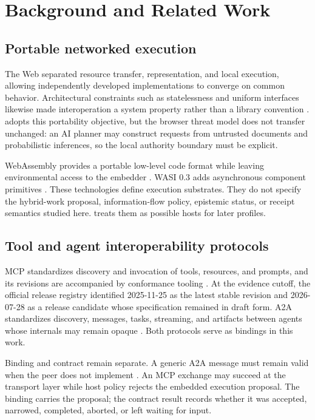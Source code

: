 \section{Background and Related Work}
\label{sec:background}

\subsection{Portable networked execution}
The Web separated resource transfer, representation, and local execution, allowing independently developed implementations to converge on common behavior. Architectural constraints such as statelessness and uniform interfaces likewise made interoperation a system property rather than a library convention \cite{Fielding2000}. \AUEC adopts this portability objective, but the browser threat model does not transfer unchanged: an AI planner may construct requests from untrusted documents and probabilistic inferences, so the local authority boundary must be explicit.

WebAssembly provides a portable low-level code format while leaving environmental access to the embedder \cite{Haas2017,W3CWasm2026}. WASI 0.3 adds asynchronous component primitives \cite{WASI03_2026}. These technologies define execution substrates. They do not specify the hybrid-work proposal, information-flow policy, epistemic status, or receipt semantics studied here. \AUEC treats them as possible hosts for later profiles.

\subsection{Tool and agent interoperability protocols}
MCP standardizes discovery and invocation of tools, resources, and prompts, and its revisions are accompanied by conformance tooling \cite{MCP2025,MCP2026,MCPConformance2026}. At the evidence cutoff, the official release registry identified 2025-11-25 as the latest stable revision and 2026-07-28 as a release candidate whose specification remained in draft form. A2A standardizes discovery, messages, tasks, streaming, and artifacts between agents whose internals may remain opaque \cite{A2A2026,A2ATCK2026}. Both protocols serve as bindings in this work.

Binding and contract remain separate. A generic A2A message must remain valid when the peer does not implement \AUEC{}. An MCP exchange may succeed at the transport layer while host policy rejects the embedded execution proposal. The binding carries the proposal; the contract result records whether it was accepted, narrowed, completed, aborted, or left waiting for input.

